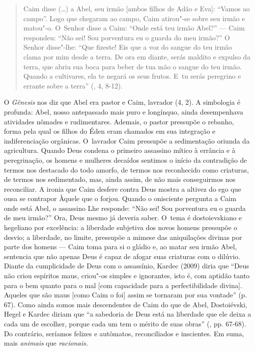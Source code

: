 \begin{quote}
Caim disse (\ldots) a Abel, seu irmão {[}ambos filhos de Adão e Eva{]}:
``Vamos ao campo''. Logo que chegaram ao campo, Caim atirou"-se sobre seu
irmão e matou"-o. O~Senhor disse a Caim: ``Onde está teu irmão Abel?'' ---
Caim respondeu: ``Não sei! Sou porventura eu o guarda do meu irmão?'' O
Senhor disse"-lhe: ``Que fizeste! Eis que a voz do sangue do teu irmão
clama por mim desde a terra. De ora em diante, serás maldito e expulso
da terra, que abriu sua boca para beber de tua mão o sangue do teu
irmão. Quando a cultivares, ela te negará os seus frutos. E~tu serás
peregrino e errante sobre a terra'' (, 4, 8-12).
\end{quote}

O \emph{Gênesis} nos diz que Abel era pastor e Caim, lavrador (4, 2). A
simbologia é profunda: Abel, nosso antepassado mais puro e longínquo,
ainda desempenhava atividades nômades e rudimentares. Ademais, o pastor
pressupõe o rebanho, forma pela qual os filhos do Éden eram chamados em
sua integração e indiferenciação orgânicas. O~lavrador Caim pressupõe a
sedimentação oriunda da agricultura. Quando Deus condena o primeiro
assassino mítico à errância e à peregrinação, os homens e mulheres
decaídos sentimos o início da contradição de termos nos destacado do
todo amorfo, de termos nos reconhecido como criaturas, de termos nos
sedimentado, mas, ainda assim, de não mais conseguirmos nos reconciliar.
A ironia que Caim desfere contra Deus mostra a altivez do ego que ousa
se contrapor Àquele que o forjou. Quando o onisciente pergunta a Caim
onde está Abel, o assassino Lhe responde: ``Não sei! Sou porventura eu o
guarda de meu irmão?'' Ora, Deus mesmo já deveria saber. O~tema é
dostoievskiano e hegeliano por excelência: a liberdade subjetiva dos
novos homens pressupõe o desvio; a liberdade, no limite, pressupõe a
mimese das aniquilações divinas por parte dos homens --- Caim toma para
si o gládio e, ao matar seu irmão Abel, sentencia que não apenas Deus é
capaz de afogar suas criaturas com o dilúvio. Diante da cumplicidade de
Deus com o assassínio, Kardec (2009) diria que ``Deus não criou
espíritos maus, criou"-os simples e ignorantes, isto é, com aptidão tanto
para o bem quanto para o mal {[}com capacidade para a perfectibilidade
divina{]}. Aqueles que são maus {[}como Caim o foi{]} assim se tornaram
por sua vontade'' (p. 67). Como ainda somos mais descendentes de Caim do
que de Abel, Dostoiévski, Hegel e Kardec diriam que ``a sabedoria de
Deus está na liberdade que ele deixa a cada um de escolher, porque cada
um tem o mérito de suas obras'' (, pp. 67-68). Do contrário,
seríamos felizes e autômatos, reconciliados e inscientes. Em suma, mais
\emph{animais} que \emph{racionais. }

